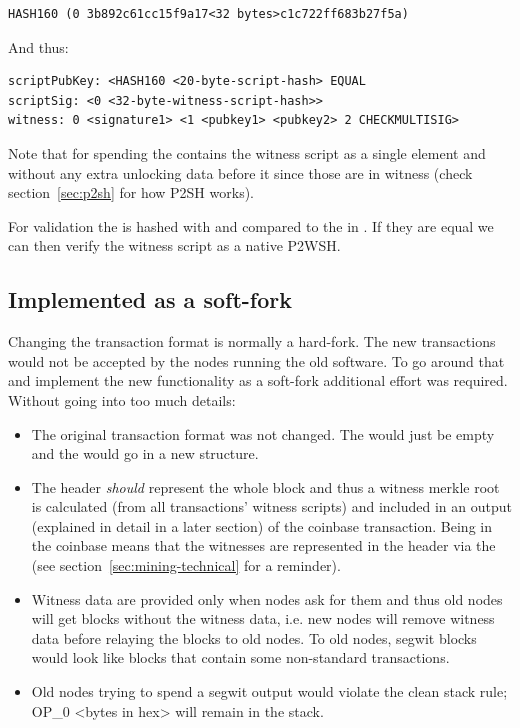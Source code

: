 \begin{emphbox}
\begin{lstlisting}[style=Pseudomath]
HASH160 (0 3b892c61cc15f9a17<32 bytes>c1c722ff683b27f5a)
\end{lstlisting}
\end{emphbox}

And thus:

\begin{emphbox}
\begin{lstlisting}[style=Pseudomath]
scriptPubKey: <HASH160 <20-byte-script-hash> EQUAL
scriptSig: <0 <32-byte-witness-script-hash>>
witness: 0 <signature1> <1 <pubkey1> <pubkey2> 2 CHECKMULTISIG>
\end{lstlisting}
\end{emphbox}

Note that for spending the  contains the witness script as a single element and without any extra unlocking data before it since those are in witness (check section~\ref{sec:p2sh} for how P2SH works).

For validation the  is hashed with  and compared to the  in . If they are equal we can then verify the witness script as a native P2WSH.


\subsection*{Implemented as a soft-fork}
Changing the transaction format is normally a hard-fork. The new transactions would not be accepted by the nodes running the old software. To go around that and implement the new functionality as a soft-fork additional effort was required. Without going into too much details:


\begin{itemize}
\item The original transaction format was not changed. The  would just be empty and the  would go in a new structure.
\item The header \emph{should} represent the whole block and thus a witness merkle root is calculated (from all transactions' witness scripts) and included in an  output (explained in detail in a later section) of the coinbase transaction. Being in the coinbase means that the witnesses are represented in the header via the  (see section~\ref{sec:mining-technical} for a reminder).
\item Witness data are provided only when nodes ask for them and thus old nodes will get blocks without the witness data, i.e. new nodes will remove witness data before relaying the blocks to old nodes. To old nodes, segwit blocks would look like blocks that contain some non-standard transactions.
\item Old nodes trying to spend a segwit output would violate the clean stack rule; OP\_0 <bytes in hex> will remain in the stack.
\end{itemize}


